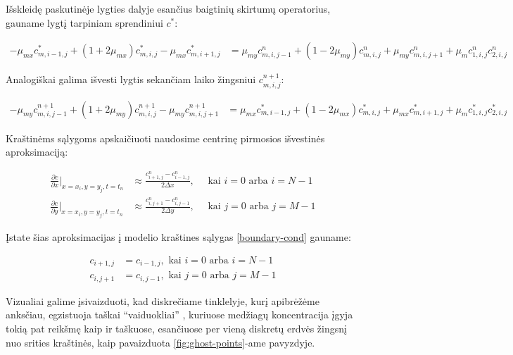 Išskleidę paskutinėje lygties dalyje esančius baigtinių skirtumų operatorius, gauname lygtį tarpiniam sprendiniui $c^*$:

\begin{align} \label{eqs:adi-short-half}
  -\mu_{mx}c^{*}_{m,i-1,j}+(1+2\mu_{mx})c^{*}_{m,i,j}-\mu_{mx}c^{*}_{m,i+1,j}
  &= \mu_{my}c^n_{m,i,j-1}+(1-2\mu_{my})c^n_{m,i,j}+\mu_{my}c^n_{m,i,j+1}+\mu_m c^n_{1,i,j}c^n_{2,i,j}
\end{align}

Analogiškai galima išvesti lygtis sekančiam laiko žingsniui $c^{n+1}_{m,i,j}$:

\begin{align} \label{eqs:adi-short-next}
  -\mu_{my}c^{n+1}_{m,i,j-1}+(1+2\mu_{my})c^{n+1}_{m,i,j}-\mu_{my}c^{n+1}_{m,i,j+1}
  &= \mu_{mx}c^*_{m,i-1,j}+(1-2\mu_{mx})c^*_{m,i,j}+\mu_{mx}c^*_{m,i+1,j}+\mu_m c^*_{1,i,j}c^*_{2,i,j}
\end{align}

Kraštinėms sąlygoms apskaičiuoti naudosime centrinę pirmosios išvestinės aproksimaciją:

\begin{align*}
  \frac{\partial c}{\partial x}\Big|_{x=x_i, y=y_j, t=t_n} 
  &\approx \frac{c^n_{i+1,j}-c^n_{i-1,j}}{2\Delta x},\quad
  \text{ kai } i = 0 \text{ arba } i = N - 1
  \\
  \frac{\partial c}{\partial y}\Big|_{x=x_i, y=y_j, t=t_n} 
  &\approx \frac{c^n_{i,j+1}-c^n_{i,j-1}}{2\Delta y},\quad
  \text{ kai } j = 0 \text{ arba } j = M - 1
\end{align*}

Įstate šias aproksimacijas į modelio kraštines sąlygas \eqref{boundary-cond} gauname:

\begin{subequations} \label{boundary-cond-approx}
\begin{align} 
  c_{i+1,j} &= c_{i-1,j}, \text{ kai } i = 0 \text{ arba } i = N-1 \\
  c_{i,j+1} &= c_{i,j-1}, \text{ kai } j = 0 \text{ arba } j = M-1
\end{align}
\end{subequations}

\newpage

Vizualiai galime įsivaizduoti, kad diskrečiame tinklelyje, kurį apibrėžėme anksčiau, egzistuoja taškai \enquote{vaiduokliai} \cite{cocoFinitedifferenceGhostpointMultigrid2013}, kuriuose medžiagų koncentracija įgyja tokią pat reikšmę kaip ir taškuose, esančiuose per vieną diskretų erdvės žingsnį nuo srities kraštinės, kaip pavaizduota \ref{fig:ghost-points}-ame pavyzdyje.

